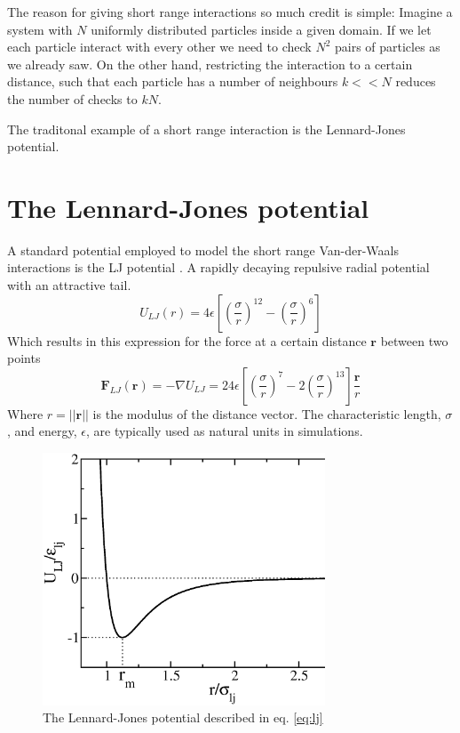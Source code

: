 \documentclass[ twoside,openright,titlepage,numbers=noenddot,%
headinclude,footinclude,cleardoublepage=empty,abstract=on,
BCOR=5mm,paper=a4,fontsize=11pt, dvipsnames
]{scrreprt}
\renewcommand{\vec}[1]{\bm{#1}}
\begin{document}
The reason for giving short range interactions so much credit is simple: Imagine a system with $N$ uniformly distributed particles inside a given domain. If we let each particle interact with every other we need to check $N^2$ pairs of particles as we already saw. On the other hand, restricting the interaction to a certain distance, such that each particle has a number of neighbours $k<<N$ reduces the number of checks to $kN$.

The traditonal example of a short range interaction is the Lennard-Jones potential.
\section{The Lennard-Jones potential}\label{sec:lj}
A standard potential employed to model the short range Van-der-Waals interactions is the \gls{LJ} potential \cite{Thol2015}. A rapidly decaying repulsive radial potential with an attractive tail.
\begin{equation}
  \label{eq:lj}
  U_{LJ}(r) = 4 \epsilon \left[ \left(\frac{\sigma}{r}\right)^{12} - \left( \frac{\sigma}{r}\right)^6 \right] 
\end{equation}
Which results in this expression for the force at a certain distance $\vec{r}$ between two points
\begin{equation}
  \label{eq:ljf}
  \vec{F}_{LJ}(\vec{r}) = -\nabla U_{LJ} = 24 \epsilon \left[ \left(\frac{\sigma}{r}\right)^{7} - 2\left( \frac{\sigma}{r}\right)^{13} \right] \frac{\vec{r}}{r}
\end{equation}
Where $r = ||\vec{r}||$ is the modulus of the distance vector. The characteristic length, $\sigma$, and energy, $\epsilon$, are typically used as natural units in simulations.
\begin{figure}
  \centering
  \includegraphics[width=0.75\textwidth]{lj}
  \caption{The Lennard-Jones potential described in eq. \ref{eq:lj}}
  \label{fig:lj}
\end{figure}
\end{document}
